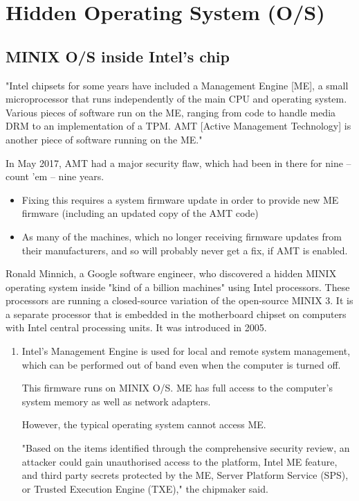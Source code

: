 \chapter{Hidden Operating System (O/S)}

\section{MINIX O/S inside Intel's chip}

"Intel chipsets for some years have included a Management Engine [ME], a small
microprocessor that runs independently of the main CPU and operating system.
Various pieces of software run on the ME, ranging from code to handle media DRM
to an implementation of a TPM. AMT [Active Management Technology] is another
piece of software running on the ME."

In May 2017, AMT had a major security flaw, which had been in there for nine --
count 'em -- nine years.
\begin{itemize}
  
  \item  Fixing this requires a system firmware update in order to provide new
  ME firmware (including an updated copy of the AMT code)
  
  \item As many of the machines, which no longer receiving firmware updates from
  their manufacturers, and so will probably never get a fix, if AMT is enabled.
  
\end{itemize}
 
Ronald Minnich, a Google software engineer, who discovered a hidden MINIX
operating system inside "kind of a billion machines" using Intel processors.
These processors are running a closed-source variation of the open-source MINIX
3. It is a separate processor that is embedded in the motherboard chipset on
computers with Intel central processing units. It was introduced in 2005.
\begin{enumerate}
  
  \item  Intel's Management Engine is used for local and remote system
  management, which can be performed out of band even when the computer is
  turned off.
  
  This firmware runs on MINIX O/S. 
  ME has full access to the computer's system memory as well as network adapters.
  
  However, the typical operating system cannot access ME.
  
  "Based on the items identified through the comprehensive security review, an
  attacker could gain unauthorised access to the platform, Intel ME feature, and
  third party secrets protected by the ME, Server Platform Service (SPS), or
  Trusted Execution Engine (TXE)," the chipmaker said.
  
\end{enumerate}




